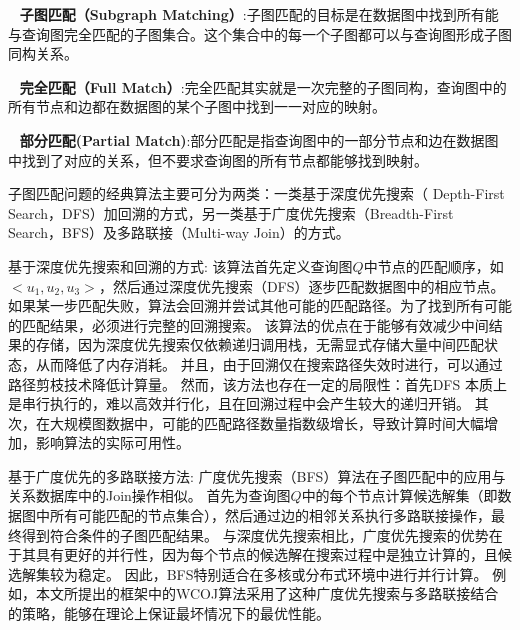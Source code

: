     \textbullet~ \textbf{子图匹配（Subgraph Matching）}:子图匹配的目标是在数据图中找到所有能与查询图完全匹配的子图集合。这个集合中的每一个子图都可以与查询图形成子图同构关系。

    \textbullet~ \textbf{完全匹配（Full Match）}:完全匹配其实就是一次完整的子图同构，查询图中的所有节点和边都在数据图的某个子图中找到一一对应的映射。

    \textbullet~ \textbf{部分匹配(Partial Match)}:部分匹配是指查询图中的一部分节点和边在数据图中找到了对应的关系，但不要求查询图的所有节点都能够找到映射。


子图匹配问题的经典算法主要可分为两类：一类基于深度优先搜索（ Depth-First Search，DFS）加回溯的方式\cite{sm-ullmann-DBLP:journals/jacm/Ullmann76}，另一类基于广度优先搜索（Breadth-First Search，BFS）及多路联接（Multi-way Join）的方式\cite{sm-bfs-DBLP:conf/focs/AtseriasGM08}。

基于深度优先搜索和回溯的方式: 该算法首先定义查询图$Q$中节点的匹配顺序，如$<u_1, u_2, u_3>$，然后通过深度优先搜索（DFS）逐步匹配数据图中的相应节点。
如果某一步匹配失败，算法会回溯并尝试其他可能的匹配路径。为了找到所有可能的匹配结果，必须进行完整的回溯搜索。
该算法的优点在于能够有效减少中间结果的存储，因为深度优先搜索仅依赖递归调用栈，无需显式存储大量中间匹配状态，从而降低了内存消耗。
并且，由于回溯仅在搜索路径失效时进行，可以通过路径剪枝技术降低计算量。
然而，该方法也存在一定的局限性：首先DFS 本质上是串行执行的，难以高效并行化，且在回溯过程中会产生较大的递归开销。
其次，在大规模图数据中，可能的匹配路径数量指数级增长，导致计算时间大幅增加，影响算法的实际可用性。

基于广度优先的多路联接方法: 广度优先搜索（BFS）算法在子图匹配中的应用与关系数据库中的Join操作相似。
首先为查询图$Q$中的每个节点计算候选解集（即数据图中所有可能匹配的节点集合），然后通过边的相邻关系执行多路联接操作，最终得到符合条件的子图匹配结果。
与深度优先搜索相比，广度优先搜索的优势在于其具有更好的并行性，因为每个节点的候选解在搜索过程中是独立计算的，且候选解集较为稳定。
因此，BFS特别适合在多核或分布式环境中进行并行计算。
例如，本文所提出的框架中的WCOJ算法\cite{sm-bfs-DBLP:conf/focs/AtseriasGM08}采用了这种广度优先搜索与多路联接结合的策略，能够在理论上保证最坏情况下的最优性能。

